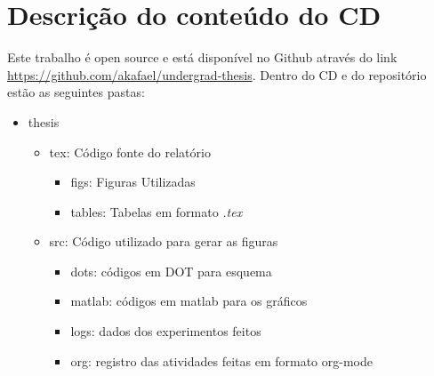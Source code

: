 \chapter{Descrição do conteúdo do CD}

\label{AnCD}

Este trabalho é open source e está disponível no Github através do link \url{https://github.com/akafael/undergrad-thesis}. Dentro do CD e do repositório estão as seguintes pastas:

\begin{itemize}
    \item thesis
    \begin{itemize}
        \item tex: Código fonte do relatório
        \begin{itemize}
            \item figs: Figuras Utilizadas
            \item tables: Tabelas em formato \textit{.tex}
        \end{itemize}
        \item src: Código utilizado para gerar as figuras
        \begin{itemize}
            \item dots: códigos em DOT para esquema
            \item matlab: códigos em matlab para os gráficos
            \item logs: dados dos experimentos feitos
            \item org: registro das atividades feitas em formato org-mode
        \end{itemize}
    \end{itemize}
\end{itemize}
